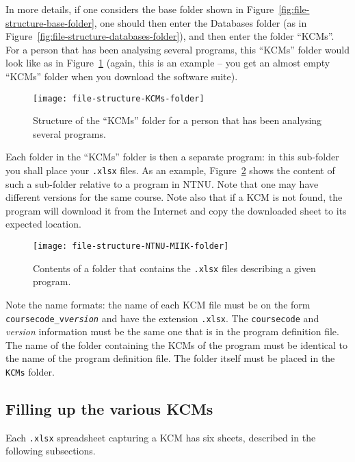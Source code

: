 In more details, if one considers the base folder shown in
Figure~\ref{fig:file-structure-base-folder}, one should then enter the
Databases folder (as in Figure~\ref{fig:file-structure-databases-folder}),
and then enter the folder ``KCMs''. For a person that has been analysing
several programs, this ``KCMs'' folder would look like as in
Figure~\ref{fig:file-structure-KCMs-folder} (again, this is an example --
you get an almost empty ``KCMs'' folder when you download the software
suite).

\begin{figure}[!htbp]
	\centering
	\texttt{[image: file-structure-KCMs-folder]}
	\caption{Structure of the ``KCMs'' folder for a person that has been analysing several programs.}
	\label{fig:file-structure-KCMs-folder}
\end{figure}

Each folder in the ``KCMs'' folder is then a separate program: in this
sub-folder you shall place your \texttt{.xlsx} files. As an example,
Figure~\ref{fig:file-structure-NTNU-MIIK-folder} shows the content of such a
sub-folder relative to a program in NTNU. Note that one may have different
versions for the same course. Note also that if a \ac{KCM} is not found, the
program will download it from the Internet and copy the downloaded sheet to
its expected location.

\begin{figure}[!htbp]
	\centering
	\texttt{[image: file-structure-NTNU-MIIK-folder]}
	\caption{Contents of a folder that contains the \texttt{.xlsx} files
	describing a given program.}
	\label{fig:file-structure-NTNU-MIIK-folder}
\end{figure}

Note the name formats: the name of each \ac{KCM} file must be on the form
\texttt{coursecode\_v\textit{version}} and have the extension
\texttt{.xlsx}. The \texttt{coursecode} and \textit{version} information
must be the same one that is in the program definition file. The name of the
folder containing the \acp{KCM} of the program must be identical to the name
of the program definition file. The folder itself must be placed in the
\texttt{KCMs} folder.

\subsection{Filling up the various \acp{KCM}}

Each \texttt{.xlsx} spreadsheet capturing a \ac{KCM} has six sheets, described in the following subsections.

